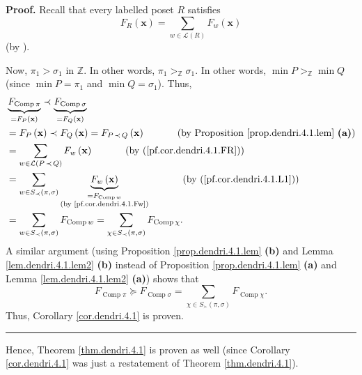 \documentclass[numbers=enddot,12pt,final,onecolumn,notitlepage]{scrartcl}%
\theoremstyle{definition}
\newenvironment{proof}[1][Proof]{\noindent\textbf{#1.} }{\ \rule{0.5em}{0.5em}}
\newenvironment{verlong}{}{}
\let\sumnonlimits\sum
\renewcommand{\sum}{\sumnonlimits\limits}
\begin{document}
\begin{verlong}
\begin{proof}
Recall that every labelled poset $R$ satisfies%
\begin{equation}
F_{R}\left(  \mathbf{x}\right)  =\sum_{w\in\mathcal{L}\left(  R\right)  }%
F_{w}\left(  \mathbf{x}\right)  \label{pf.cor.dendri.4.1.FR}%
\end{equation}
(by \cite[Theorem 5.2.11]{HopfComb}).

Now, $\pi_{1}>\sigma_{1}$ in $\mathbb{Z}$. In other words, $\pi_{1}%
>_{\mathbb{Z}}\sigma_{1}$. In other words, $\min P>_{\mathbb{Z}}\min Q$ (since
$\min P=\pi_{1}$ and $\min Q=\sigma_{1}$). Thus,
\begin{align*}
& \underbrace{F_{\operatorname*{Comp}\pi}}_{=F_{P}\left(  \mathbf{x}\right)
}\left.  \prec\right.  \underbrace{F_{\operatorname*{Comp}\sigma}}%
_{=F_{Q}\left(  \mathbf{x}\right)  }\\
& =F_{P}\left(  \mathbf{x}\right)  \left.  \prec\right.  F_{Q}\left(
\mathbf{x}\right)  =F_{P\left.  \prec\right.  Q}\left(  \mathbf{x}\right)
\ \ \ \ \ \ \ \ \ \ \left(  \text{by Proposition \ref{prop.dendri.4.1.lem}
\textbf{(a)}}\right)  \\
& =\sum_{w\in\mathcal{L}\left(  P\left.  \prec\right.  Q\right)  }F_{w}\left(
\mathbf{x}\right)  \ \ \ \ \ \ \ \ \ \ \left(  \text{by
(\ref{pf.cor.dendri.4.1.FR})}\right)  \\
& =\sum_{w\in S_{\prec}\left(  \pi,\sigma\right)  }\underbrace{F_{w}\left(
\mathbf{x}\right)  }_{\substack{=F_{\operatorname*{Comp}w}\\\text{(by
\eqref{pf.cor.dendri.4.1.Fw})}}}\ \ \ \ \ \ \ \ \ \ \left(  \text{by
(\ref{pf.cor.dendri.4.1.L1})}\right)  \\
& =\sum_{w\in S_{\prec}\left(  \pi,\sigma\right)  }F_{\operatorname*{Comp}%
w}=\sum_{\chi\in S_{\prec}\left(  \pi,\sigma\right)  }F_{\operatorname*{Comp}%
\chi}.
\end{align*}
A similar argument (using Proposition \ref{prop.dendri.4.1.lem} \textbf{(b)}
and Lemma \ref{lem.dendri.4.1.lem2} \textbf{(b)} instead of Proposition
\ref{prop.dendri.4.1.lem} \textbf{(a)} and Lemma \ref{lem.dendri.4.1.lem2}
\textbf{(a)}) shows that%
\[
F_{\operatorname*{Comp}\pi}\left.  \succeq\right.  F_{\operatorname*{Comp}%
\sigma}=\sum_{\chi\in S_{\succ}\left(  \pi,\sigma\right)  }%
F_{\operatorname*{Comp}\chi}.
\]
Thus, Corollary \ref{cor.dendri.4.1} is proven.
\end{proof}

Hence, Theorem \ref{thm.dendri.4.1} is proven as well (since Corollary
\ref{cor.dendri.4.1} was just a restatement of Theorem \ref{thm.dendri.4.1}).


\end{verlong}
\end{document}
